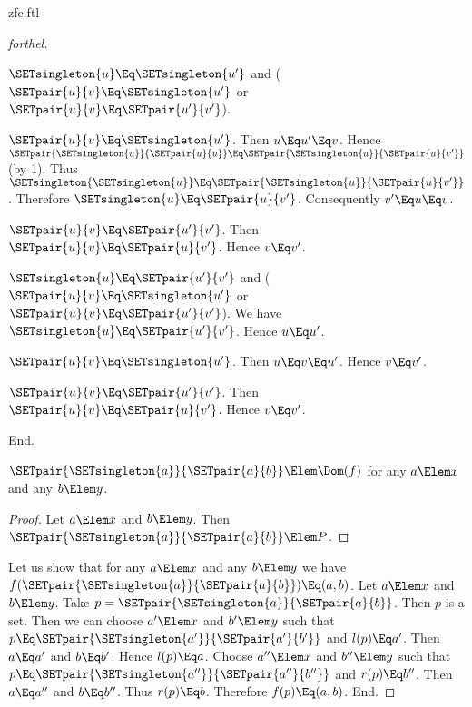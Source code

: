 \documentclass{stex}
\begin{document}
\begin{smodule}{zfc.ftl}
\begin{proof}[forthel]
\begin{case}{$\SETsingleton{u} \Eq \SETsingleton{u'}$ and ($\SETpair{u}{v} \Eq \SETsingleton{u'}$ or $\SETpair{u}{v} \Eq \SETpair{u'}{v'}$).}
      \begin{case}{$\SETpair{u}{v} \Eq \SETsingleton{u'}$.}
        Then $u \Eq u'\Eq v$.
        Hence $\SETpair{\SETsingleton{u}}{\SETpair{u}{u}} \Eq \SETpair{\SETsingleton{u}}{\SETpair{u}{v'}}$ (by 1).
        Thus $\SETsingleton{\SETsingleton{u}} \Eq \SETpair{\SETsingleton{u}}{\SETpair{u}{v'}}$.
        Therefore $\SETsingleton{u} \Eq \SETpair{u}{v'}$.
        Consequently $v' \Eq u \Eq v$.
      \end{case}

      \begin{case}{$\SETpair{u}{v} \Eq \SETpair{u'}{v'}$.}
        Then $\SETpair{u}{v} \Eq \SETpair{u}{v'}$.
        Hence $v \Eq v'$.
      \end{case}
    \end{case}

    \begin{case}{$\SETsingleton{u} \Eq \SETpair{u'}{v'}$ and ($\SETpair{u}{v} \Eq \SETsingleton{u'}$ or $\SETpair{u}{v} \Eq \SETpair{u'}{v'}$).}
      We have $\SETsingleton{u} \Eq \SETpair{u'}{v'}$.
      Hence $u \Eq u'$.

      \begin{case}{$\SETpair{u}{v} \Eq \SETsingleton{u'}$.}
        Then $u \Eq v \Eq u'$.
        Hence $v \Eq v'$.
      \end{case}

      \begin{case}{$\SETpair{u}{v} \Eq \SETpair{u'}{v'}$.}
        Then $\SETpair{u}{v} \Eq \SETpair{u}{v'}$.
        Hence $v \Eq v'$.
      \end{case}
    \end{case}
  End.

  $\SETpair{\SETsingleton{a}}{\SETpair{a}{b}} \Elem \Dom(f)$ for any $a \Elem x$ and any $b \Elem y$. %
  \begin{proof}
    Let $a \Elem x$ and $b \Elem y$.
    Then $\SETpair{\SETsingleton{a}}{\SETpair{a}{b}} \Elem P$.
  \end{proof}

  Let us show that for any $a \Elem x$ and any $b \Elem y$ we have $f(\SETpair{\SETsingleton{a}}{\SETpair{a}{b}}) \Eq (a,b)$.
    Let $a \Elem x$ and $b \Elem y$.
    Take $p = \SETpair{\SETsingleton{a}}{\SETpair{a}{b}}$.
    Then $p$ is a set.
    Then we can choose $a' \Elem x$ and $b' \Elem y$ such that $p \Eq \SETpair{\SETsingleton{a'}}{\SETpair{a'}{b'}}$ and $l(p) \Eq a'$.
    Then $a \Eq a'$ and $b \Eq b'$.
    Hence $l(p) \Eq a$.
    Choose $a'' \Elem x$ and $b'' \Elem y$ such that $p \Eq \SETpair{\SETsingleton{a''}}{\SETpair{a''}{b''}}$ and $r(p) \Eq b''$.
    Then $a \Eq a''$ and $b \Eq b''$.
    Thus $r(p) \Eq b$.
    Therefore $f(p) \Eq (a,b)$.
  End.


\end{proof}
\end{smodule}
\end{document}
